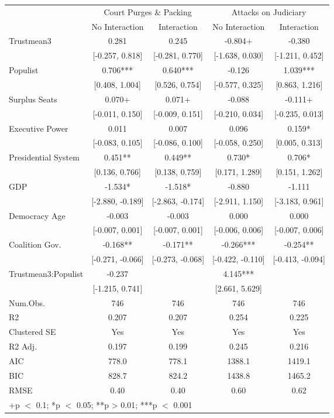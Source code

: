 \begin{table}
\centering\centering\centering
\fontsize{10}{12}\selectfont
\begin{tabular}[t]{lcccc}
\toprule
\multicolumn{1}{c}{ } & \multicolumn{2}{c}{Court Purges \& Packing} & \multicolumn{2}{c}{Attacks on Judiciary} \\
\cmidrule(l{3pt}r{3pt}){2-3} \cmidrule(l{3pt}r{3pt}){4-5}
  & No Interaction & Interaction & No Interaction  & Interaction \\
\midrule
Trustmean3 & 0.281 & 0.245 & -0.804+ & -0.380\\
 & {}[-0.257, 0.818] & {}[-0.281, 0.770] & {}[-1.638, 0.030] & {}[-1.211, 0.452]\\
Populist & 0.706*** & 0.640*** & -0.126 & 1.039***\\
 & {}[0.408, 1.004] & {}[0.526, 0.754] & {}[-0.577, 0.325] & {}[0.863, 1.216]\\
Surplus Seats & 0.070+ & 0.071+ & -0.088 & -0.111+\\
 & {}[-0.011, 0.150] & {}[-0.009, 0.151] & {}[-0.210, 0.034] & {}[-0.235, 0.013]\\
Executive Power & 0.011 & 0.007 & 0.096 & 0.159*\\
 & {}[-0.083, 0.105] & {}[-0.086, 0.100] & {}[-0.058, 0.250] & {}[0.005, 0.313]\\
Presidential System & 0.451** & 0.449** & 0.730* & 0.706*\\
 & {}[0.136, 0.766] & {}[0.138, 0.759] & {}[0.171, 1.289] & {}[0.151, 1.262]\\
GDP & -1.534* & -1.518* & -0.880 & -1.111\\
 & {}[-2.880, -0.189] & {}[-2.863, -0.174] & {}[-2.911, 1.150] & {}[-3.183, 0.961]\\
Democracy Age & -0.003 & -0.003 & 0.000 & 0.000\\
 & {}[-0.007, 0.001] & {}[-0.007, 0.001] & {}[-0.006, 0.006] & {}[-0.007, 0.006]\\
Coalition Gov. & -0.168** & -0.171** & -0.266*** & -0.254**\\
 & {}[-0.271, -0.066] & {}[-0.273, -0.068] & {}[-0.422, -0.110] & {}[-0.413, -0.094]\\
Trustmean3:Populist & -0.237 &  & 4.145*** & \\
 & {}[-1.215, 0.741] &  & {}[2.661, 5.629] & \\
\midrule
Num.Obs. & 746 & 746 & 746 & 746\\
R2 & 0.207 & 0.207 & 0.254 & 0.225\\
Clustered SE & Yes & Yes & Yes & Yes\\
R2 Adj. & 0.197 & 0.199 & 0.245 & 0.216\\
AIC & 778.0 & 778.1 & 1388.1 & 1419.1\\
BIC & 828.7 & 824.2 & 1438.8 & 1465.2\\
RMSE & 0.40 & 0.40 & 0.60 & 0.62\\
\bottomrule
\multicolumn{5}{l}{\rule{0pt}{1em}+p $<$ 0.1; *p $<$ 0.05; **p > 0.01; ***p $<$ 0.001}\\
\end{tabular}
\end{table}
